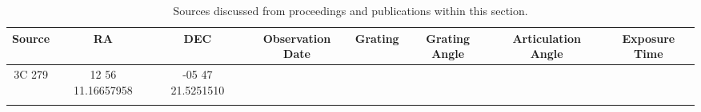\begin{table}[t]
    \centering
    \begin{tabular}{cccccccc}
        Source & RA                & DEC               & Observation Date & Grating & Grating Angle & Articulation Angle & Exposure Time \\ \hline
        3C 279 & 12 56 11.16657958 & -05 47 21.5251510 &                  &         &               &                    &               \\ %
               &                   &                   &                  &         &               &                    &               \\ \hline
    \end{tabular}
    \caption{Sources discussed from proceedings and publications within this section.}
    \label{table:sci_targets}
\end{table}
